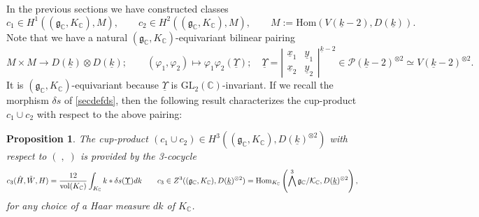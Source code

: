 \documentclass{amsart}
\newtheorem{proposition}[theorem]{Proposition}
\theoremstyle{definition}
\theoremstyle{remark}
\numberwithin{equation}{section}
\newcommand{\GL}{{\mathrm{GL}}}
\newcommand{\C}{{\mathbb C}}
\newcommand{\cK}{{\mathcal K}}
\newcommand{\cP}{{\mathcal P}}
\newcommand{\mfg}{{\mathfrak g}}
\newcommand{\Hom}{{\mathrm {Hom}}}
\begin{document}
In the previous sections we have constructed classes
\[
c_1\in H^1((\mfg_\C,K_\C),M),\qquad c_2\in H^2((\mfg_\C,K_\C),M),\qquad M:=\Hom(V(\underline k-2),D({\underline k})).
\]
Note that we have a natural $(\mfg_\C,K_\C)$-equivariant bilinear pairing
\[
M\times M\longrightarrow D({\underline k})\otimes D({\underline k});\qquad (\varphi_1,\varphi_2)\mapsto\varphi_1\varphi_2(\underline{\Upsilon});\quad \underline{\Upsilon}=\left|\begin{array}{cc}
    \underline x_1 & \underline y_1 \\
    \underline x_2 & \underline y_2
\end{array}\right|^{\underline k-2}\in\cP(\underline{k}-2)^{\otimes 2}\simeq V(\underline{k}-2)^{\otimes 2}.
\]
It is $(\mfg_\C,K_\C)$-equivariant because $\underline{\Upsilon}$ is $\GL_2(\C)$-invariant. 
If we recall the morphism $\delta s$ of \eqref{secdefds}, then the following result characterizes the cup-product $c_1\cup c_2$ with respect to the above pairing:
\begin{proposition}\label{propcupprod2}
    The cup-product $(c_1\cup c_2)\in H^3((\mfg_\C,K_\C),D({\underline k})^{\otimes 2})$ with respect to $(\;,\;)$ is provided by the 3-cocycle 
    \[
    c_3(\hat H,\tilde W,H)=\frac{12}{{\rm vol}(K_\C)}\int_{K_\C}k\ast \delta s(\underline{\Upsilon})d k\qquad c_3\in Z^3((\mfg_\C,K_\C),D({\underline k})^{\otimes 2})=\Hom_{K_\C}\left(\bigwedge^3\mfg_\C/\cK_\C,D({\underline k})^{\otimes 2}\right),
    \]
    for any choice of a Haar measure $dk$ of $K_\C$.
\end{proposition}
\end{document}
